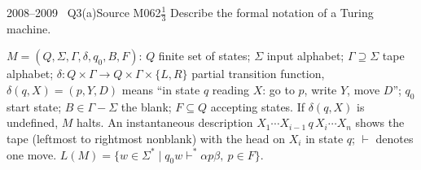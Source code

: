 \documentclass[11pt,a4paper]{article}
\begin{document}
\begin{question}{2008--2009 \textbullet\ Q3(a)}{Source M06}{2$\tfrac13$}
Describe the formal notation of a Turing machine.
\end{question}
\begin{solution}
$M=(Q,\Sigma,\Gamma,\delta,q_0,B,F)$: $Q$ finite set of states; $\Sigma$ input alphabet; $\Gamma\supseteq\Sigma$ tape alphabet; $\delta:Q\times\Gamma\to Q\times\Gamma\times\{L,R\}$ partial transition function, $\delta(q,X)=(p,Y,D)$ means ``in state $q$ reading $X$: go to $p$, write $Y$, move $D$''; $q_0$ start state; $B\in\Gamma-\Sigma$ the blank; $F\subseteq Q$ accepting states. If $\delta(q,X)$ is undefined, $M$ halts. An instantaneous description $X_1\cdots X_{i-1}\,q\,X_i\cdots X_n$ shows the tape (leftmost to rightmost nonblank) with the head on $X_i$ in state $q$; $\vdash$ denotes one move. $L(M)=\{w\in\Sigma^*\mid q_0w\vdash^*\alpha p\beta,\ p\in F\}$.
\end{solution}
\end{document}

